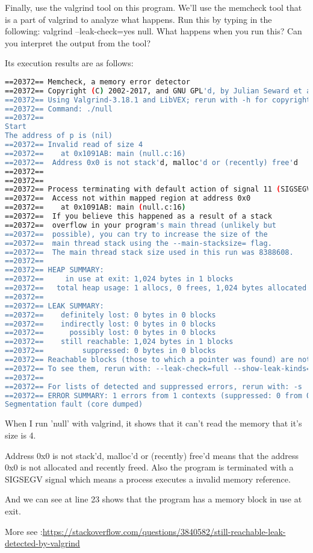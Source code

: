 \documentclass[10pt, answers]{exam}
\begin{document}
\begin{questions} 
\setcounter{question}{2} 
\question 
Finally, use the valgrind tool on this program. We’ll use the memcheck
tool that is a part of valgrind to analyze what happens. Run
this by typing in the following: valgrind --leak-check=yes
null. What happens when you run this? Can you interpret the
output from the tool?
\begin{solution}
    
Its execution results are as follows:
\begin{lstlisting}[language=bash]
==20372== Memcheck, a memory error detector
==20372== Copyright (C) 2002-2017, and GNU GPL'd, by Julian Seward et al.
==20372== Using Valgrind-3.18.1 and LibVEX; rerun with -h for copyright info
==20372== Command: ./null
==20372== 
Start
The address of p is (nil)
==20372== Invalid read of size 4
==20372==    at 0x1091AB: main (null.c:16)
==20372==  Address 0x0 is not stack'd, malloc'd or (recently) free'd
==20372== 
==20372== 
==20372== Process terminating with default action of signal 11 (SIGSEGV)
==20372==  Access not within mapped region at address 0x0
==20372==    at 0x1091AB: main (null.c:16)
==20372==  If you believe this happened as a result of a stack
==20372==  overflow in your program's main thread (unlikely but
==20372==  possible), you can try to increase the size of the
==20372==  main thread stack using the --main-stacksize= flag.
==20372==  The main thread stack size used in this run was 8388608.
==20372== 
==20372== HEAP SUMMARY:
==20372==     in use at exit: 1,024 bytes in 1 blocks
==20372==   total heap usage: 1 allocs, 0 frees, 1,024 bytes allocated
==20372== 
==20372== LEAK SUMMARY:
==20372==    definitely lost: 0 bytes in 0 blocks
==20372==    indirectly lost: 0 bytes in 0 blocks
==20372==      possibly lost: 0 bytes in 0 blocks
==20372==    still reachable: 1,024 bytes in 1 blocks
==20372==         suppressed: 0 bytes in 0 blocks
==20372== Reachable blocks (those to which a pointer was found) are not shown.
==20372== To see them, rerun with: --leak-check=full --show-leak-kinds=all
==20372== 
==20372== For lists of detected and suppressed errors, rerun with: -s
==20372== ERROR SUMMARY: 1 errors from 1 contexts (suppressed: 0 from 0)
Segmentation fault (core dumped)
\end{lstlisting}
When I run 'null' with valgrind, it shows that it can't 
read the memory that it's size is 4.

Address 0x0 is not stack'd, malloc'd or (recently) free'd means that
the address 0x0 is not allocated and recently freed. Also the program 
is terminated with a SIGSEGV signal which means a process executes a 
invalid memory reference.

And we can see at line 23 shows that the program has a memory block in use at exit.

More see :\url{https://stackoverflow.com/questions/3840582/still-reachable-leak-detected-by-valgrind}

\end{solution}
\end{questions}
\end{document}
